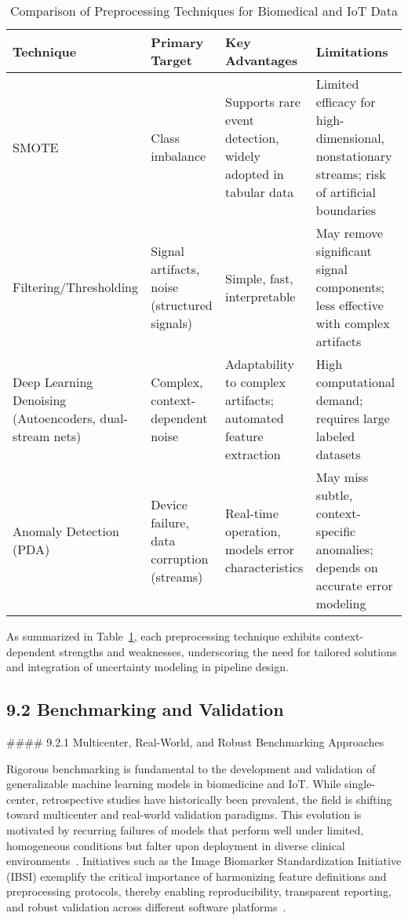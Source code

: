 \documentclass[11pt]{article}
\begin{document}
\begin{table}[ht]
\centering
\caption{Comparison of Preprocessing Techniques for Biomedical and IoT Data}
\label{tab:preprocessing_comparison}
\begin{tabular}{|l|p{3.5cm}|p{3.5cm}|p{4cm}|}
\hline
\textbf{Technique} & \textbf{Primary Target} & \textbf{Key Advantages} & \textbf{Limitations} \\
\hline
SMOTE & Class imbalance & Supports rare event detection, widely adopted in tabular data & Limited efficacy for high-dimensional, nonstationary streams; risk of artificial boundaries\\
\hline
Filtering/Thresholding & Signal artifacts, noise (structured signals) & Simple, fast, interpretable & May remove significant signal components; less effective with complex artifacts\\
\hline
Deep Learning Denoising (Autoencoders, dual-stream nets) & Complex, context-dependent noise & Adaptability to complex artifacts; automated feature extraction & High computational demand; requires large labeled datasets\\
\hline
Anomaly Detection (PDA) & Device failure, data corruption (streams) & Real-time operation, models error characteristics & May miss subtle, context-specific anomalies; depends on accurate error modeling\\
\hline
\end{tabular}
\end{table}

As summarized in Table~\ref{tab:preprocessing_comparison}, each preprocessing technique exhibits context-dependent strengths and weaknesses, underscoring the need for tailored solutions and integration of uncertainty modeling in pipeline design.

\subsection{9.2 Benchmarking and Validation}

#### 9.2.1 Multicenter, Real-World, and Robust Benchmarking Approaches

Rigorous benchmarking is fundamental to the development and validation of generalizable machine learning models in biomedicine and IoT. While single-center, retrospective studies have historically been prevalent, the field is shifting toward multicenter and real-world validation paradigms. This evolution is motivated by recurring failures of models that perform well under limited, homogeneous conditions but falter upon deployment in diverse clinical environments~\cite{ref31,ref33,ref44}. Initiatives such as the Image Biomarker Standardization Initiative (IBSI) exemplify the critical importance of harmonizing feature definitions and preprocessing protocols, thereby enabling reproducibility, transparent reporting, and robust validation across different software platforms~\cite{ref49,ref50,ref54}.
\end{document}
